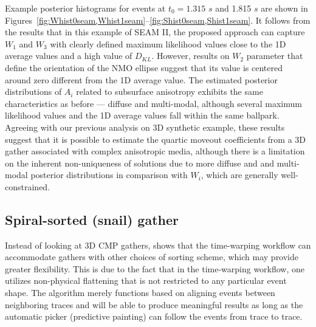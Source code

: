 Example posterior histograms for events at $t_0=1.315$ $s$ and 1.815 $s$ are shown in Figures~\ref{fig:Whist0seam,Whist1seam}--\ref{fig:Shist0seam,Shist1seam}. It follows from the results that in this example of SEAM II, the proposed approach can capture $W_1$ and $W_3$ with clearly defined maximum likelihood values close to the 1D average values and a high value of $D_{KL}$. However, results on $W_{2}$ parameter that define the orientation of the NMO ellipse suggest that its value is centered around zero different from the 1D average value. The estimated posterior distributions of $A_i$ related to subsurface anisotropy exhibits the same characteristics as before --- diffuse and multi-modal, although several maximum likelihood values and the 1D average values fall within the same ballpark. Agreeing with our previous analysis on 3D synthetic example, these results suggest that it is possible to estimate the quartic moveout coefficients from a 3D gather associated with complex anisotropic media, although there is a limitation on the inherent non-uniqueness of solutions due to more diffuse and and multi-modal posterior distributions in comparison with $W_i$, which are generally well-constrained. 





\subsection{Spiral-sorted (snail) gather}

Instead of looking at 3D CMP gathers, \cite{willthesis} shows that the time-warping workflow can accommodate gathers with other choices of sorting scheme, which may provide greater flexibility. This is due to the fact that in the time-warping workflow, one utilizes non-physical flattening that is not restricted to any particular event shape. The algorithm merely functions based on aligning events between neighboring traces and will be able to produce meaningful results as long as the automatic picker (predictive painting) can follow the events from trace to trace. 

